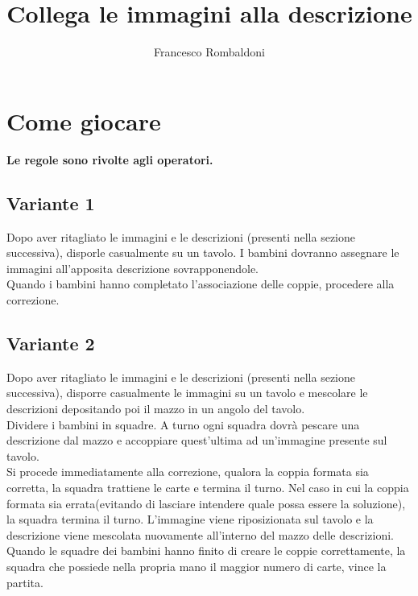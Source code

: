 \documentclass[hidelinks,12pt,a4paper]{article}
\begin{document}
	
	\title{\textbf{\\Collega le immagini alla descrizione}}
	\author{Francesco Rombaldoni}
	\date{}
	
	\maketitle
	\newpage
	
	\tableofcontents
	\newpage
	
	\section{Come giocare}
	\begin{center}
		\textbf{Le regole sono rivolte agli operatori.}
	\end{center}
	
	\subsection{Variante 1}
	 Dopo aver ritagliato le immagini e le descrizioni (presenti nella sezione successiva), disporle casualmente su un tavolo. I bambini dovranno assegnare le immagini all'apposita descrizione sovrapponendole.\\
	Quando i bambini hanno completato l'associazione delle coppie, procedere alla correzione.
	
	\subsection{Variante 2}
	Dopo aver ritagliato le immagini e le descrizioni (presenti nella sezione successiva), disporre casualmente le immagini su un tavolo e mescolare le descrizioni depositando poi il mazzo in un angolo del tavolo.\\
	Dividere i bambini in squadre. A turno ogni squadra dovrà pescare una descrizione dal mazzo e accoppiare quest'ultima ad un'immagine presente sul tavolo.\\
	Si procede immediatamente alla correzione, qualora la coppia formata sia corretta, la squadra trattiene le carte e termina il turno. Nel caso in cui la coppia formata sia errata(evitando di lasciare intendere quale possa essere la soluzione), la squadra termina il turno. L'immagine viene riposizionata sul tavolo e la descrizione viene mescolata nuovamente all'interno del mazzo delle descrizioni.\\
	Quando le squadre dei bambini hanno finito di creare le coppie correttamente, la squadra che possiede nella propria mano il maggior numero di carte, vince la partita.
	
\end{document}
